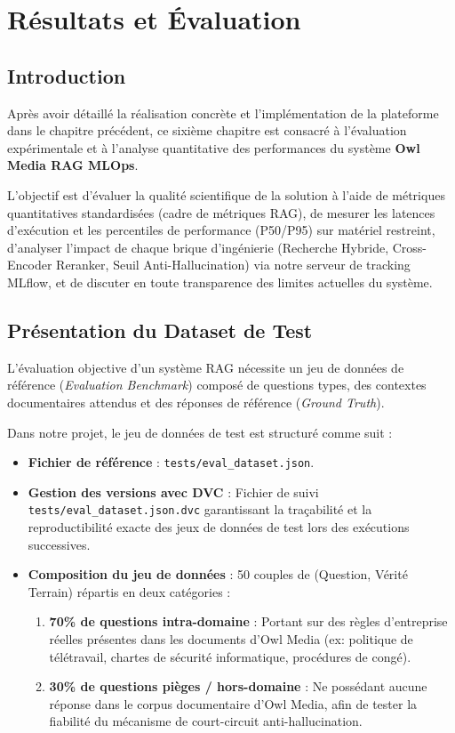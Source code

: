 \chapter{Résultats et Évaluation}
\label{chap:resultats_evaluation}

\section{Introduction}
Après avoir détaillé la réalisation concrète et l'implémentation de la plateforme dans le chapitre précédent, ce sixième chapitre est consacré à l'évaluation expérimentale et à l'analyse quantitative des performances du système \textbf{Owl Media RAG MLOps}. 

L'objectif est d'évaluer la qualité scientifique de la solution à l'aide de métriques quantitatives standardisées (cadre de métriques RAG), de mesurer les latences d'exécution et les percentiles de performance (P50/P95) sur matériel restreint, d'analyser l'impact de chaque brique d'ingénierie (Recherche Hybride, Cross-Encoder Reranker, Seuil Anti-Hallucination) via notre serveur de tracking MLflow, et de discuter en toute transparence des limites actuelles du système.

\section{Présentation du Dataset de Test}
L'évaluation objective d'un système RAG nécessite un jeu de données de référence (\textit{Evaluation Benchmark}) composé de questions types, des contextes documentaires attendus et des réponses de référence (\textit{Ground Truth}).

Dans notre projet, le jeu de données de test est structuré comme suit :
\begin{itemize}
    \item \textbf{Fichier de référence} : \texttt{tests/eval\_dataset.json}.
    \item \textbf{Gestion des versions avec DVC} : Fichier de suivi \texttt{tests/eval\_dataset.json.dvc} garantissant la traçabilité et la reproductibilité exacte des jeux de données de test lors des exécutions successives.
    \item \textbf{Composition du jeu de données} : 50 couples de (Question, Vérité Terrain) répartis en deux catégories :
    \begin{enumerate}
        \item \textbf{70\% de questions intra-domaine} : Portant sur des règles d'entreprise réelles présentes dans les documents d'Owl Media (ex: politique de télétravail, chartes de sécurité informatique, procédures de congé).
        \item \textbf{30\% de questions pièges / hors-domaine} : Ne possédant aucune réponse dans le corpus documentaire d'Owl Media, afin de tester la fiabilité du mécanisme de court-circuit anti-hallucination.
    \end{enumerate}
\end{itemize}

